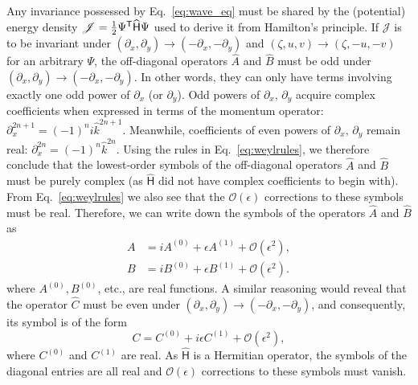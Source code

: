 \begin{subappendices}
Any invariance possessed by Eq.~\eqref{eq:wave_eq} must be shared by the (potential) energy density $\mathscr{J} = \frac{1}{2}\Psi^\mathsf{T}\widehat{\mathsf{H}}\Psi$ used to derive it from Hamilton's principle.
If $\mathscr{J}$ is to be invariant under $(\partial_{x}, \partial_{y}) \to (-\partial_{x}, -\partial_{y})$ and $(\zeta, u, v) \to (\zeta, -u, -v)$ for an arbitrary $\Psi$, the off-diagonal operators $\widehat{A}$ and $\widehat{B}$ must be odd under $(\partial_{x}, \partial_{y}) \to (-\partial_{x}, -\partial_{y})$.
In other words, they can only have terms involving exactly one odd power of $\partial_{x}$ (or $\partial_{y}$).
Odd powers of $\partial_{x},\, \partial_{y}$ acquire complex coefficients when expressed in terms of the momentum operator: $\partial_{x}^{2n+1} = (-1)^{n}i\hat{k}^{2n+1}$.
Meanwhile, coefficients of even powers of $\partial_{x},\, \partial_{y}$ remain real: $\partial_{x}^{2n} = (-1)^{n}\hat{k}^{2n}$.
Using the rules in Eq.~\eqref{eq:weylrules}, we therefore conclude that the lowest-order symbols of the off-diagonal operators  $\widehat{A}$ and $\widehat{B}$ must be purely complex (as $\widehat{\mathsf{H}}$ did not have complex coefficients to begin with).
From Eq.~\eqref{eq:weylrules} we also see that the $\mathcal{O}(\epsilon)$ corrections to these symbols must be real.
Therefore, we can write down the symbols of the operators $\widehat{A}$ and $\widehat{B}$ as
%
\begin{equation}
  \begin{aligned}
    A &= iA^{(0)} + \epsilon A^{(1)} + \mathcal{O}(\epsilon^{2}),\\
    B &= iB^{(0)} + \epsilon B^{(1)} + \mathcal{O}(\epsilon^{2}).
  \end{aligned}
\end{equation}
%
where $A^{(0)}, B^{(0)}$, etc., are real functions.
A similar reasoning would reveal that the operator $\widehat{C}$ must be even under $(\partial_{x}, \partial_{y}) \to (-\partial_{x}, -\partial_{y})$, and consequently, its symbol is of the form
%
\begin{equation}
  C = C^{(0)} + i\epsilon C^{(1)} + \mathcal{O}(\epsilon^{2}),
\end{equation}
%
where $C^{(0)}$ and $C^{(1)}$ are real.
%
As $\widehat{\mathsf{H}}$ is a Hermitian operator, the symbols of the diagonal entries are all real and $\mathcal{O}(\epsilon)$ corrections to these symbols must vanish.


\end{subappendices}
